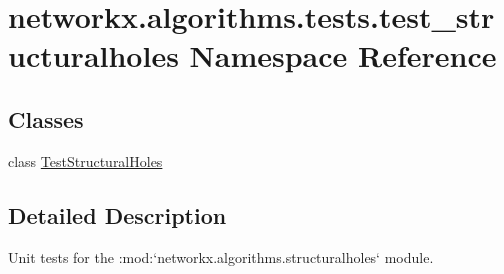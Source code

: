 \hypertarget{namespacenetworkx_1_1algorithms_1_1tests_1_1test__structuralholes}{}\section{networkx.\+algorithms.\+tests.\+test\+\_\+structuralholes Namespace Reference}
\label{namespacenetworkx_1_1algorithms_1_1tests_1_1test__structuralholes}
\subsection*{Classes}
\begin{DoxyCompactItemize}
\item 
class \hyperlink{classnetworkx_1_1algorithms_1_1tests_1_1test__structuralholes_1_1TestStructuralHoles}{Test\+Structural\+Holes}
\end{DoxyCompactItemize}


\subsection{Detailed Description}
\begin{DoxyVerb}Unit tests for the :mod:`networkx.algorithms.structuralholes` module.\end{DoxyVerb}
 